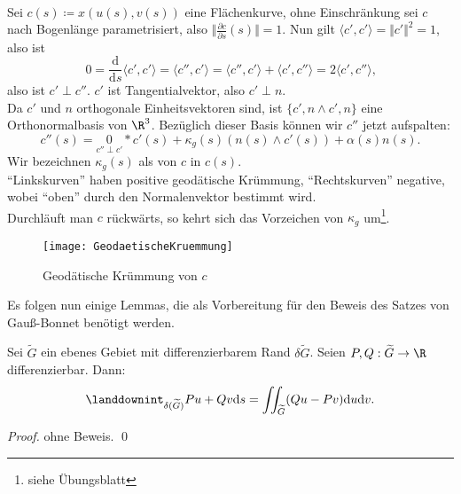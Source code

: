 \begin{definition}
  \  \\
  Sei \( c(s) \coloneqq x(u(s), v(s)) \) eine Flächenkurve, ohne Einschränkung sei \( c \) nach Bogenlänge parametrisiert, also \( \Vert \frac{\partial c}{\partial s} (s) \Vert = 1 \). Nun gilt \( \langle c', c' \rangle = \Vert c' \Vert^2 = 1 \), also ist
  \begin{equation*}
    0 = \frac{\text{d}}{\text{d}s}\langle c', c' \rangle = \langle c'', c' \rangle = \langle c'', c' \rangle + \langle c', c'' \rangle = 2\langle c', c'' \rangle\text{,}
  \end{equation*}
  also ist \( c' \perp c'' \). \( c' \) ist Tangentialvektor, also \( c' \perp n \). \\
  Da \( c' \) und \( n \) orthogonale Einheitsvektoren sind, ist \( \{ c', n \wedge c', n \} \) eine Orthonormalbasis von \( \R^3 \). Bezüglich dieser Basis können wir \( c'' \) jetzt aufspalten:
  \begin{equation*}
    c''(s) = \underset{c'' \perp c'}{0}*c'(s) + \kappa_g(s)(n(s) \wedge c'(s)) + \alpha(s)n(s)\text{.}
  \end{equation*}
  Wir bezeichnen \( \kappa_g(s) \) als \label{def:geodaetischeKruemmung} von \( c \) in \( c(s) \). \\
  ``Linkskurven'' haben positive geodätische Krümmung, ``Rechtskurven'' negative, wobei ``oben'' durch den Normalenvektor bestimmt wird. \\
  Durchläuft man \( c \) rückwärts, so kehrt sich das Vorzeichen von \( \kappa_g \) um\footnote{siehe Übungsblatt}.
  \begin{figure}[H]
    \texttt{[image: GeodaetischeKruemmung]}
    \caption{Geodätische Krümmung von \( c \)}
  \end{figure}
\end{definition}


Es folgen nun einige Lemmas, die als Vorbereitung für den Beweis des Satzes von Gauß-Bonnet benötigt werden.

\begin{lemma}
  Sei \( \widetilde{G} \) ein ebenes Gebiet mit differenzierbarem Rand \( \delta\widetilde{G} \). Seien \( P,Q : \widetilde{G} \to \R \) differenzierbar. Dann:
  \begin{equation*}
     \landdownint_{\delta(\widetilde{G})}Pu+Qv \text{d}s = \iint_{\widetilde{G}}(Qu-Pv)\text{d}u\text{d}v\text{.}
  \end{equation*} 
  \begin{proof}
    ohne Beweis. \qed{}
  \end{proof}
\end{lemma}

